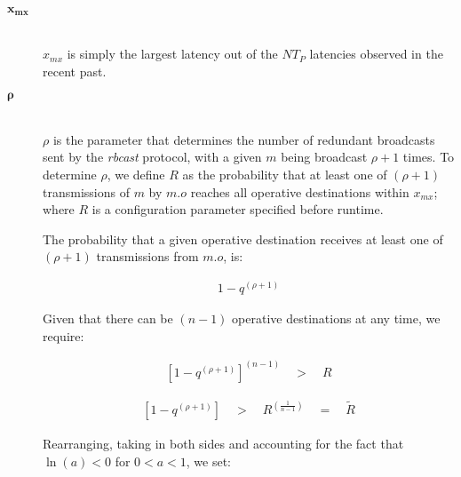         \begin{description}
        \item[\Huge$\boldsymbol{x_{mx}}$] \hfill \\
        $x_{mx}$ is simply the largest latency out of the $NT_P$ latencies observed in the recent past.  
        
        \item[\Huge$\boldsymbol{\rho}$] \hfill \\
        $\rho$ is the parameter that determines the number of redundant broadcasts sent by the \emph{rbcast} protocol, with a given $m$ being broadcast $\rho + 1$ times.  To determine $\rho$, we define $R$ as the probability that at least one of $(\rho + 1)$ transmissions of $m$ by $m.o$ reaches all operative destinations within $x_{mx}$; where $R$ is a configuration parameter specified before runtime.  
        
        The probability that a given operative destination receives at least one of $(\rho + 1)$ transmissions from $m.o$, is:
        
        \begin{equation}
            \begin{aligned}
                1 - q^{\left( \rho + 1 \right)}
            \end{aligned}
        \end{equation}
        
        Given that there can be $(n - 1)$ operative destinations at any time, we require:
        
        \begin{equation}
            \begin{aligned}
                \left[1 - q^{\left(\rho + 1\right)}\right]^{\left(n - 1\right)} \quad > \quad R
            \end{aligned}
        \end{equation}
        
        \begin{equation} \label{eq:q_mx}
            \begin{aligned}
                \left[1 - q^{\left(\rho + 1\right)}\right] \quad > \quad R ^{\left(\frac{1}{n - 1}\right)} \quad = \quad \tilde{R}
            \end{aligned}
        \end{equation}
        
        Rearranging, taking in both sides and accounting for the fact that $\ln(a) < 0$ for  $0 < a < 1$, we set:
        

\end{description}
